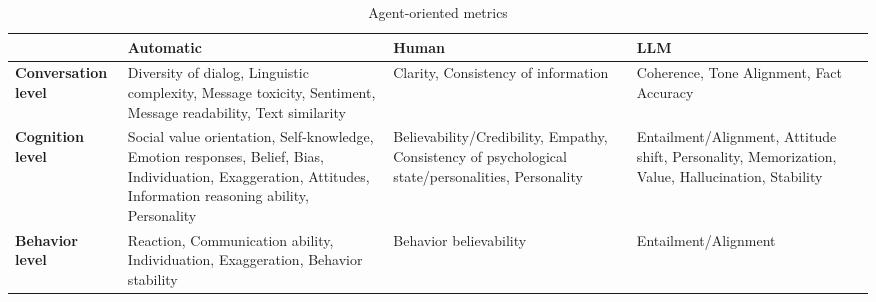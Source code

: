 \begin{table*}[]
\small
\caption{Agent-oriented metrics}
\label{tab:agent_metrics}
\begin{tabular}{p{2cm} p{4cm} p{4cm} p{4cm}}
\toprule
                              & \textbf{Automatic}                                                                                                                                            & \textbf{Human}                                                                                    & \textbf{LLM}                                                                                     \\ \midrule
\textbf{Conversation level} & Diversity of dialog, Linguistic complexity, Message toxicity, Sentiment, Message readability, Text similarity                                                 & Clarity, Consistency of information                                                               & Coherence, Tone Alignment, Fact Accuracy                                                         \\
\midrule
\textbf{Cognition level}      & Social value orientation, Self-knowledge, Emotion responses, Belief, Bias, Individuation, Exaggeration, Attitudes, Information reasoning ability, Personality & Believability/Credibility, Empathy, Consistency of psychological state/personalities, Personality & Entailment/Alignment, Attitude shift, Personality, Memorization, Value, Hallucination, Stability \\
\midrule
\textbf{Behavior level}     & Reaction, Communication ability, Individuation, Exaggeration, Behavior stability                                                                              & Behavior believability                                                                            & Entailment/Alignment                                                                             \\ \bottomrule
\end{tabular}
\end{table*}